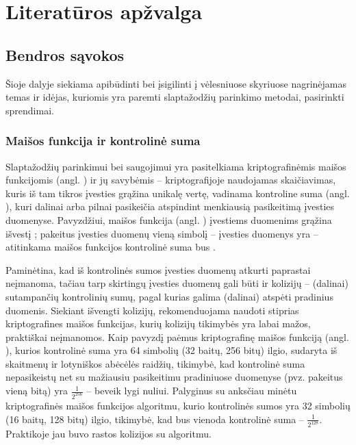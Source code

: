 \documentclass{VUMIFInfBakalaurinis}
\begin{document}
\section{Literatūros apžvalga}
\subsection{Bendros sąvokos}
Šioje dalyje siekiama apibūdinti bei įsigilinti į vėlesniuose skyriuose 
nagrinėjamas temas ir idėjas, kuriomis yra paremti slaptažodžių parinkimo 
metodai, pasirinkti sprendimai.

\subsubsection{Maišos funkcija ir kontrolinė suma} \label{sec:hashing}
Slaptažodžių parinkimui bei saugojimui yra pasitelkiama kriptografinėmis maišos 
funkcijomis (angl. ) ir jų savybėmis -- kriptografijoje 
naudojamas skaičiavimas, kuris iš tam tikros įvesties grąžina unikalę vertę, 
vadinama kontroline suma (angl. ), kuri dalinai arba pilnai 
pasikeičia atspindint menkiausią pasikeitimą įvesties duomenyse. Pavyzdžiui, 
maišos funkcija  (angl. ) 
įvestiems duomenims  grąžina išvestį 
; pakeitus įvesties duomenų vieną 
simbolį -- įvesties duomenys yra  -- atitinkama 
 maišos funkcijos kontrolinė suma bus 
.

Paminėtina, kad iš kontrolinės sumos įvesties duomenų atkurti paprastai 
neįmanoma, tačiau tarp skirtingų įvesties duomenų gali būti ir kolizijų -- 
(dalinai) sutampančių kontrolinių sumų, pagal kurias galima (dalinai) atspėti 
pradinius duomenis. Siekiant išvengti kolizijų, rekomenduojama naudoti stiprias 
kriptografines maišos funkcijas, kurių kolizijų tikimybės yra labai mažos, 
praktiškai neįmanomos. Kaip pavyzdį paėmus  kriptografinę 
maišos funkciją (angl. ), kurios 
kontrolinė suma yra 64 simbolių (32 baitų, 256 bitų) ilgio, sudaryta iš 
skaitmenų ir lotyniškos abėcėlės raidžių, tikimybė, kad kontrolinė suma 
nepasikeistų net su mažiausiu pasikeitimu pradiniuose duomenyse (pvz. pakeitus 
vieną bitą) yra $\frac{1}{2^{256}}$ -- beveik lygi nuliui. Palyginus su anksčiau 
minėtu  kriptografinės maišos funkcijos algoritmu, kurio 
kontrolinės sumos yra 32 simbolių (16 baitų, 128 bitų) ilgio, tikimybė, kad bus 
vienoda kontrolinė suma -- $\frac{1}{2^{128}}$. Praktikoje jau buvo rastos 
kolizijos su  algoritmu.
\end{document}
